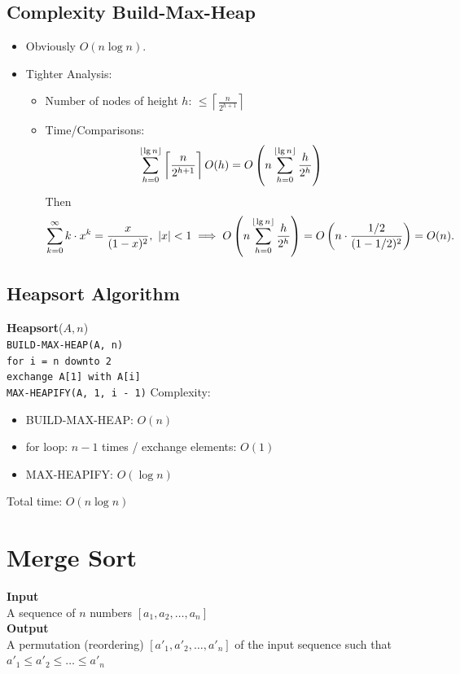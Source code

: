 \documentclass[12pt,openany]{book}
\DeclarePairedDelimiter{\floor}{\lfloor}{\rfloor}
\theoremstyle{definition}
\renewcommand{\abs}[1]{\left\lvert #1 \right\rvert}
\newcommand{\of}[1]{\left( #1 \right)}
\begin{document}
	\subsection{Complexity Build-Max-Heap}
	\begin{itemize}
		\item Obviously \( O(n \log n) \).
		\item Tighter Analysis: \begin{itemize}
			\item Number of nodes of height \( h \): \( \leq \left\lceil \frac{n}{2^{h+1}} \right\rceil \)
			\item Time/Comparisons:
			\[
			\sum_{h=0}^{\floor*{\lg n}} \left\lceil \frac{n}{2^{h+1}} \right\rceil O(h) = O \left( n \sum_{h=0}^{\floor*{\lg n}} \frac{h}{2^h} \right)
			\] Then \[
			\sum_{k=0}^{\infty} k \cdot x^k=\frac{x}{(1-x)^2},\ \abs{x}< 1\implies O \left( n \sum_{h=0}^{\floor*{\lg n}} \frac{h}{2^h} \right)=O\of{n\cdot\frac{1/2}{(1-1/2)^2}}=O(n).
			\]
		\end{itemize}
	\end{itemize}
	
	
	\subsection{Heapsort Algorithm}
	\textbf{Heapsort}(\(A, n\))\\
	\texttt{BUILD-MAX-HEAP(A, n)}\\
	\texttt{for i = n downto 2}\\
	\texttt{exchange A[1] with A[i]}\\
	\texttt{MAX-HEAPIFY(A, 1, i - 1)}
	Complexity:
	\begin{itemize}
		\item BUILD-MAX-HEAP: \( O(n) \)
		\item for loop: \( n - 1 \) times / exchange elements: \( O(1) \)
		\item MAX-HEAPIFY: \( O(\log n) \)
	\end{itemize}
	
	Total time: \( O(n \log n) \)
	
	\newpage
	\section{Merge Sort}
	\textbf{Input}\\
	A sequence of \( n \) numbers \( [a_1, a_2, \ldots, a_n] \)
	\\
	\textbf{Output}\\
	A permutation (reordering) \( [a'_1, a'_2, \ldots, a'_n] \) of the input sequence such that \( a'_1 \leq a'_2 \leq \ldots \leq a'_n \)
	
\end{document}
